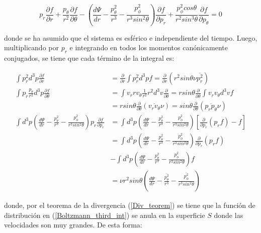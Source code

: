 \begin{appendix}
\begin{equation}
p_r \frac{\partial f}{\partial r} + \frac{p_\theta}{r^2} \frac{\partial f}{\partial \theta} - \left ( \frac{d \Psi}{d r}  - \frac{p_\theta^2}{r^3} - \frac{p_\phi^2}{r^3 sin^2\theta} \right ) \frac{\partial f}{\partial p_r} + \frac{p_\phi^2 cos \theta}{r^2 sin^3\theta} \frac{\partial f}{\partial p_\theta} = 0
\end{equation}

donde se ha asumido que el sistema es esférico e independiente del tiempo. Luego, multiplicando por $p_r$ e integrando en todos los momentos canónicamente conjugados, se tiene que cada término de la integral es:

\begin{align}
\int p_r^2 d^3 p \frac{\partial f}{\partial r} &= \frac{\partial }{\partial r} \int p_r^2 d^3 p f = \frac{\partial }{\partial r} (r^2 sin \theta \nu \overline{p_r^2}) \\
\int p_r \frac{p_\theta}{r^2} d^3 p \frac{\partial f}{\partial \theta} &= \int v_r r v_\theta \frac{1}{r^2} r^2 d^3 v \frac{\partial }{\partial \theta} = r sin \theta \frac{\partial }{\partial \theta} \int v_r v_\theta d^3v f \\
& = r sin \theta \frac{\partial }{\partial \theta} (\overline{v_r v_\theta } \nu) = sin \theta \frac{\partial }{\partial \theta} (\overline{p_r p_\theta } \nu) \\
\int d^3 p \left ( \frac{d \Psi}{d r}  - \frac{p_\theta^2}{r^3} - \frac{p_\phi^2}{r^3 sin^2\theta} \right ) p_r \frac{\partial f}{\partial p_r} & = \int  d^3 p \left ( \frac{d \Psi}{d r} - \frac{p_\theta^2}{r^3} - \frac{p_\phi^2}{r^3 sin^2\theta} \right ) \left [ \frac{\partial }{\partial p_r} (p_r f) - f \right ] \\
\label{Boltzmann_third_int}
& = \int  d^3 p \left ( \frac{d \Psi}{d r} - \frac{p_\theta^2}{r^3} - \frac{p_\phi^2}{r^3 sin^2\theta} \right ) \frac{\partial }{\partial p_r} (p_r f)\\
&- \int  d^3 p \left ( \frac{d \Psi}{d r} - \frac{p_\theta^2}{r^3} - \frac{p_\phi^2}{r^3 sin^2\theta} \right ) f \\
& = \nu r^2 sin \theta \left ( \frac{d \Psi}{d r} - \frac{ \overline{p_\theta^2} }{r^3} - \frac{ \overline{p_\phi^2} }{r^3 sin^2\theta} \right )
\end{align}

donde, por el teorema de la divergencia (\ref{Div_teorem}) se tiene que la función de distribución en (\ref{Boltzmann_third_int}) se anula en la superficie $S$ donde las velocidades son muy grandes. De esta forma:


\end{appendix}
